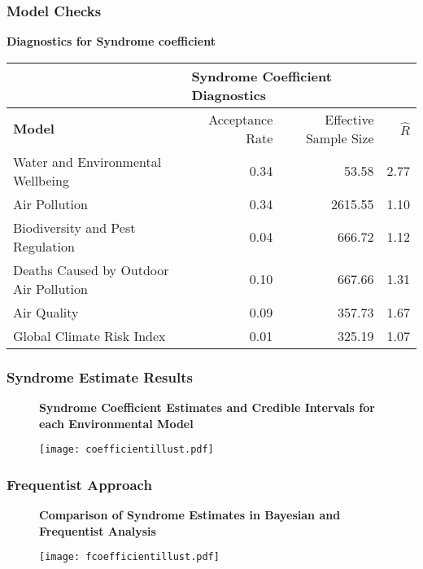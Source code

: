 \documentclass{beamer}
\begin{document}
\begin{frame}
\frametitle{Model Checks}
\centering
\textbf{Diagnostics for Syndrome coefficient}
\tiny
\begin{table}[htb]
    \centering
    \begin{tabular}{l|r|r|r}
      & \multicolumn{3}{l}{\textbf{Syndrome Coefficient Diagnostics}} \\
     \hline
     \textbf{Model} & Acceptance Rate & Effective Sample Size & $\hat{R}$ \\
    \hline
    Water and Environmental Wellbeing & 0.34 & 53.58 & 2.77 \\
    Air Pollution  & 0.34 & 2615.55 & 1.10 \\
    Biodiversity and Pest Regulation  & 0.04 & 666.72 & 1.12 \\
    Deaths Caused by Outdoor Air Pollution  & 0.10 & 667.66 & 1.31 \\
    Air Quality & 0.09 & 357.73 & 1.67 \\
    Global Climate Risk Index  & 0.01 & 325.19 & 1.07 \\
    \end{tabular}
    \label{diagSyn}
\end{table}
\end{frame}

\begin{frame}
\frametitle{Syndrome Estimate Results}
\begin{figure}
\textbf{Syndrome Coefficient Estimates and Credible Intervals for each Environmental Model}\par\medskip
\centering
  \texttt{[image: coefficientillust.pdf]}
\end{figure}
\end{frame}

\begin{frame}
\frametitle{Frequentist Approach}
\begin{figure}
\textbf{Comparison of Syndrome Estimates in Bayesian and Frequentist Analysis}\par\medskip
\centering
  \texttt{[image: fcoefficientillust.pdf]}
\end{figure}
\end{frame}
\end{document}

